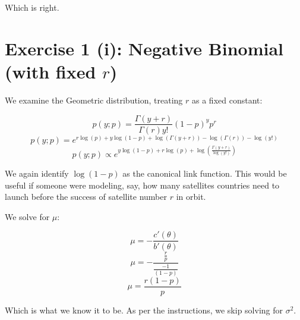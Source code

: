 \documentclass[12pt,a4paper]{article}
\begin{document}
Which is right. 

\newpage
\section{Exercise 1 (i): Negative Binomial (with fixed $r$)}

We examine the Geometric distribution, treating $r$ as a fixed constant: 

$$p(y; p) = \frac{\Gamma(y+r)}{\Gamma(r)y!}(1-p)^yp^r$$
$$p(y; p) = e^{r\log(p) + y\log(1-p) + \log(\Gamma(y+r)) - \log(\Gamma(r)) - \log(y!)}$$
$$p(y; p) \propto e^{y\log(1-p) + r\log(p) + \log(\frac{\Gamma(y+r)}{\log(y!)})}$$

We again identify $\log(1-p)$ as the canonical link function. This would be useful if someone were modeling, say, how many satellites countries need to launch before the success of satellite number $r$ in orbit.

\newpage

We solve for $\mu$: 

$$\mu = - \frac{c'(\theta)}{b'(\theta)}$$
$$\mu = - \frac{\frac{r}{p}}{\frac{-1}{(1-p)}}$$
$$\mu = \frac{r(1-p)}{p}$$

Which is what we know it to be. As per the instructions, we skip solving for $\sigma^{2}$.
\end{document}

